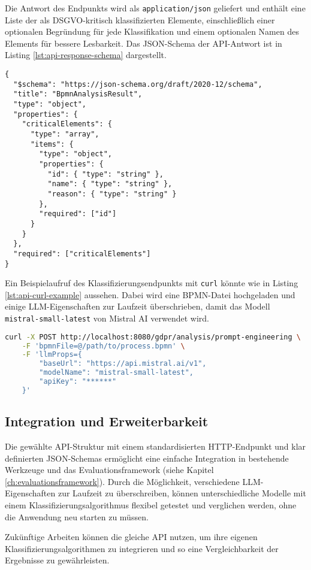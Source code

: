 Die Antwort des Endpunkts wird als \texttt{application/json} geliefert und enthält eine Liste der als \ac{DSGVO}-kritisch klassifizierten Elemente, einschließlich einer optionalen Begründung für jede Klassifikation und einem optionalen Namen des Elements für bessere Lesbarkeit. Das JSON-Schema der API-Antwort ist in Listing \ref{lst:api-response-schema} dargestellt.

\begin{lstlisting}[caption={JSON-Schema der API-Antwort.},label={lst:api-response-schema}]
{
  "$schema": "https://json-schema.org/draft/2020-12/schema",
  "title": "BpmnAnalysisResult",
  "type": "object",
  "properties": {
    "criticalElements": {
      "type": "array",
      "items": {
        "type": "object",
        "properties": {
          "id": { "type": "string" },
          "name": { "type": "string" },
          "reason": { "type": "string" }
        },
        "required": ["id"]
      }
    }
  },
  "required": ["criticalElements"]
}
\end{lstlisting}

Ein Beispielaufruf des Klassifizierungsendpunkts mit \texttt{curl} könnte wie in Listing \ref{lst:api-curl-example} aussehen. Dabei wird eine BPMN-Datei hochgeladen und einige \ac{LLM}-Eigenschaften zur Laufzeit überschrieben, damit das Modell \texttt{mistral-small-latest} von Mistral AI verwendet wird.

\begin{lstlisting}[language=bash,caption={Beispielaufruf des Klassifizierungsendpunkts mit \texttt{curl}.},label={lst:api-curl-example}]
curl -X POST http://localhost:8080/gdpr/analysis/prompt-engineering \
    -F 'bpmnFile=@/path/to/process.bpmn' \
    -F 'llmProps={
        "baseUrl": "https://api.mistral.ai/v1",
        "modelName": "mistral-small-latest",
        "apiKey": "******"
    }'
\end{lstlisting}

\subsection*{Integration und Erweiterbarkeit}

Die gewählte API-Struktur mit einem standardisierten HTTP-Endpunkt und klar definierten JSON-Schemas ermöglicht eine einfache Integration in bestehende Werkzeuge und das Evaluationsframework (siehe Kapitel \ref{ch:evaluationsframework}). Durch die Möglichkeit, verschiedene \ac{LLM}-Eigenschaften zur Laufzeit zu überschreiben, können unterschiedliche Modelle mit einem Klassifizierungsalgorithmus flexibel getestet und verglichen werden, ohne die Anwendung neu starten zu müssen.

Zukünftige Arbeiten können die gleiche API nutzen, um ihre eigenen Klassifizierungsalgorithmen zu integrieren und so eine Vergleichbarkeit der Ergebnisse zu gewährleisten.